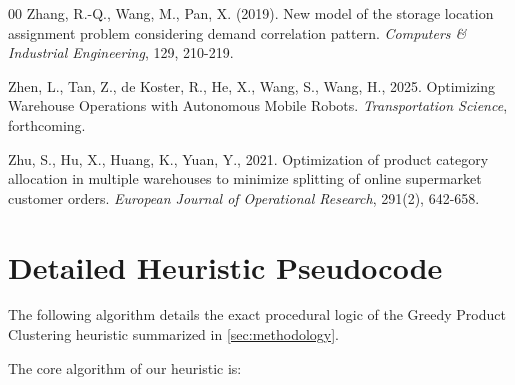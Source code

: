 \documentclass[preprint,review,11pt,authoryear]{elsarticle}
\begin{document}
\begin{thebibliography}{00}
Zhang, R.-Q., Wang, M., Pan, X. (2019).
New model of the storage location assignment problem considering demand correlation pattern.
\textit{Computers \& Industrial Engineering}, 129, 210-219.




Zhen, L., Tan, Z., de Koster, R., He, X., Wang, S., Wang, H., 2025. Optimizing Warehouse Operations with Autonomous Mobile Robots. \textit{Transportation Science}, forthcoming.

Zhu, S., Hu, X., Huang, K., Yuan, Y., 2021. Optimization of product category allocation in multiple warehouses to minimize splitting of online supermarket customer orders. \textit{European Journal of Operational Research}, 291(2), 642-658.

\end{thebibliography}
\newpage

\appendix
\section{Detailed Heuristic Pseudocode}
\label{sec:appendix_heuristic}

The following algorithm details the exact procedural logic of the Greedy Product Clustering heuristic summarized in \cref{sec:methodology}.

\noindent The core algorithm of our heuristic is:
\end{document}
